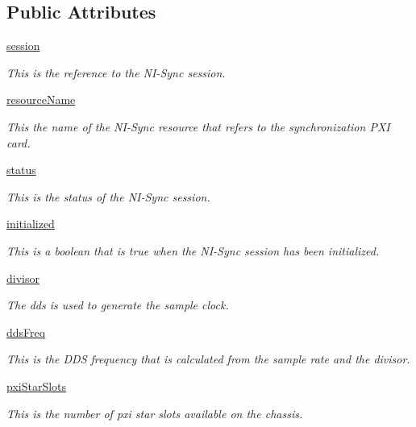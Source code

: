 \subsection*{Public Attributes}
\begin{DoxyCompactItemize}
\item 
\hyperlink{class_chassis_8git_1_1_timing_1_1_timing_a8bce703953eed1bd9c9cfd33a28515a2}{session}
\begin{DoxyCompactList}\small\item\em This is the reference to the N\-I-\/\-Sync session. \end{DoxyCompactList}\item 
\hyperlink{class_chassis_8git_1_1_timing_1_1_timing_a3357175a0fe511b96437a0fd8baf3fc4}{resource\-Name}
\begin{DoxyCompactList}\small\item\em This the name of the N\-I-\/\-Sync resource that refers to the synchronization P\-X\-I card. \end{DoxyCompactList}\item 
\hyperlink{class_chassis_8git_1_1_timing_1_1_timing_aa436c65a85fddf23300de2af3e2f01f6}{status}
\begin{DoxyCompactList}\small\item\em This is the status of the N\-I-\/\-Sync session. \end{DoxyCompactList}\item 
\hyperlink{class_chassis_8git_1_1_timing_1_1_timing_adb8c3cb047beca2237a36edf1ea42432}{initialized}
\begin{DoxyCompactList}\small\item\em This is a boolean that is true when the N\-I-\/\-Sync session has been initialized. \end{DoxyCompactList}\item 
\hyperlink{class_chassis_8git_1_1_timing_1_1_timing_aaaf0df2e649cc66725ef0578a9b4ad39}{divisor}
\begin{DoxyCompactList}\small\item\em The dds is used to generate the sample clock. \end{DoxyCompactList}\item 
\hyperlink{class_chassis_8git_1_1_timing_1_1_timing_a6d07dfa513f351c6e1f8ccd283439207}{dds\-Freq}
\begin{DoxyCompactList}\small\item\em This is the D\-D\-S frequency that is calculated from the sample rate and the divisor. \end{DoxyCompactList}\item 
\hyperlink{class_chassis_8git_1_1_timing_1_1_timing_ab50b63f49e67b9dfc14cdcdc9b562a51}{pxi\-Star\-Slots}
\begin{DoxyCompactList}\small\item\em This is the number of pxi star slots available on the chassis. \end{DoxyCompactList}\end{DoxyCompactItemize}
